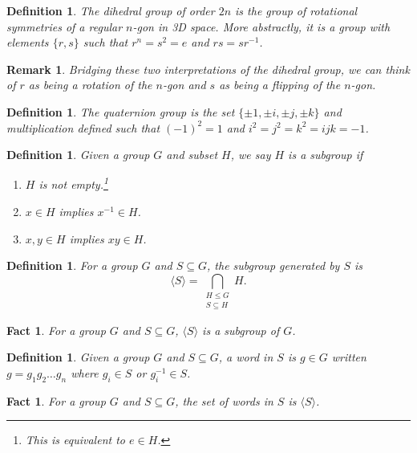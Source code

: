 \documentclass[a4paper,12pt]{article}
\theoremstyle{sltheorem}
\newtheorem{definition}[theorem]{Definition}
\newtheorem{remark}[theorem]{Remark}
\newtheorem{fact}[theorem]{Fact}
\begin{document}
\begin{definition}\label{dihedral_def}
    The \textit{dihedral group} of order $2n$ is the group of rotational symmetries of a regular $n$-gon in 3D space. More abstractly, it is a group with elements $\{r, s\}$ such that $r^n = s^2 = e$ and $rs = sr^{-1}$.
\end{definition}

\begin{remark}
Bridging these two interpretations of the dihedral group, we can think of $r$ as being a rotation of the $n$-gon and $s$ as being a flipping of the $n$-gon.
\end{remark}

\begin{definition}\label{quaternion_def}
The \textit{quaternion group} is the set $\{\pm 1, \pm i, \pm j, \pm k\}$ and multiplication defined such that ${(-1)}^2 = 1$ and $i^2 = j^2 = k^2 = ijk = -1$.
\end{definition}

\begin{definition}
    Given a group $G$ and subset $H$, we say $H$ is a \textit{subgroup} if 
    \begin{enumerate}
        \item $H$ is not empty.\footnote{This is equivalent to $e \in H$.}
        \item $x \in H$ implies $x^{-1} \in H$.
        \item $x, y \in H$ implies $xy \in H$. 
    \end{enumerate}
\end{definition}

\begin{definition}
    For a group $G$ and $S \subseteq G$, the subgroup \textit{generated} by $S$ is \[\langle S \rangle = \bigcap_{\substack{H \leq G \\ S \subseteq H}} H.\]
\end{definition}

\begin{fact}
    For a group $G$ and $S \subseteq G$, $\langle S \rangle$ is a subgroup of $G$.
\end{fact}

\begin{definition}\label{word_def}
    Given a group $G$ and $S \subseteq G$, a \textit{word} in $S$ is $g \in G$ written $g = g_1 g_2 \dots g_n$ where $g_i \in S$ or $g_i^{-1} \in S$. 
\end{definition}

\begin{fact}
    For a group $G$ and $S \subseteq G$, the set of words in $S$ is $\langle S \rangle$.
\end{fact}
\end{document}
